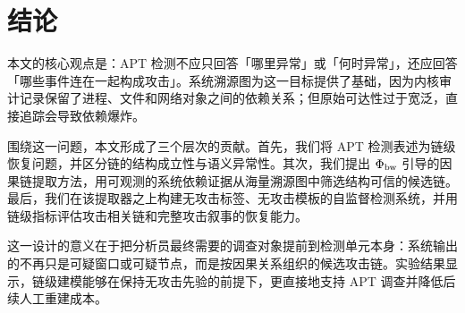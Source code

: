 \section{结论}
\label{sec:conclusion}

本文的核心观点是：APT 检测不应只回答「哪里异常」或「何时异常」，还应回答「哪些事件连在一起构成攻击」。系统溯源图为这一目标提供了基础，因为内核审计记录保留了进程、文件和网络对象之间的依赖关系；但原始可达性过于宽泛，直接追踪会导致依赖爆炸。

围绕这一问题，本文形成了三个层次的贡献。首先，我们将 APT 检测表述为链级恢复问题，并区分链的结构成立性与语义异常性。其次，我们提出 $\Phi_{\text{bw}}$ 引导的因果链提取方法，用可观测的系统依赖证据从海量溯源图中筛选结构可信的候选链。最后，我们在该提取器之上构建无攻击标签、无攻击模板的自监督检测系统，并用链级指标评估攻击相关链和完整攻击叙事的恢复能力。

这一设计的意义在于把分析员最终需要的调查对象提前到检测单元本身：系统输出的不再只是可疑窗口或可疑节点，而是按因果关系组织的候选攻击链。实验结果显示，链级建模能够在保持无攻击先验的前提下，更直接地支持 APT 调查并降低后续人工重建成本。

